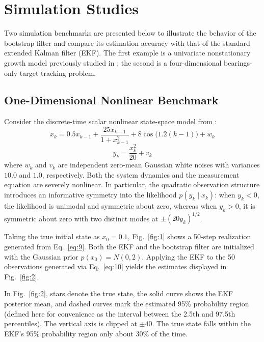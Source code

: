 \section{Simulation Studies}\label{sec:sim}

Two simulation benchmarks are presented below to illustrate the behavior of the bootstrap filter and compare its estimation accuracy with that of the standard extended Kalman filter (EKF). The first example is a univariate nonstationary growth model previously studied in \cite{r08,r10}; the second is a four-dimensional bearings-only target tracking problem.

\subsection{One-Dimensional Nonlinear Benchmark}\label{sec:sim-1d}

Consider the discrete-time scalar nonlinear state-space model from \cite{r08}:
\begin{equation}\label{eq:9}
x_k = 0.5 x_{k-1} + \frac{25 x_{k-1}}{1 + x_{k-1}^2} + 8 \cos\bigl(1.2(k - 1)\bigr) + w_k
\end{equation}
\begin{equation}\label{eq:10}
y_k = \frac{x_k^2}{20} + v_k
\end{equation}
where $w_k$ and $v_k$ are independent zero-mean Gaussian white noises with variances $10.0$ and $1.0$, respectively. Both the system dynamics and the measurement equation are severely nonlinear. In particular, the quadratic observation structure introduces an informative symmetry into the likelihood $p(y_k \mid x_k)$: when $y_k < 0$, the likelihood is unimodal and symmetric about zero, whereas when $y_k > 0$, it is symmetric about zero with two distinct modes at $\pm (20 y_k)^{1/2}$.

Taking the true initial state as $x_0 = 0.1$, Fig.~\ref{fig:1} shows a 50-step realization generated from Eq.~\eqref{eq:9}. Both the EKF and the bootstrap filter are initialized with the Gaussian prior $p(x_0) = N(0, 2)$. Applying the EKF to the 50 observations generated via Eq.~\eqref{eq:10} yields the estimates displayed in Fig.~\ref{fig:2}.


In Fig.~\ref{fig:2}, stars denote the true state, the solid curve shows the EKF posterior mean, and dashed curves mark the estimated 95\% probability region (defined here for convenience as the interval between the 2.5th and 97.5th percentiles). The vertical axis is clipped at $\pm 40$. The true state falls within the EKF's 95\% probability region only about 30\% of the time.

